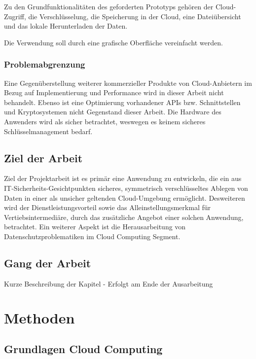 \documentclass[12pt,a4paper,bibliography=totocnumbered,listof=totocnumbered]{scrartcl}
\begin{document}
Zu den Grundfunktionalitäten des geforderten Prototyps gehören der Cloud-Zugriff, die Verschlüsselung, die Speicherung in der Cloud, eine Dateiübersicht und das lokale Herunterladen der Daten.

Die Verwendung soll durch eine grafische Oberfläche vereinfacht werden.

\subsubsection{Problemabgrenzung}
Eine Gegenüberstellung weiterer kommerzieller Produkte von Cloud-Anbietern im Bezug auf Implementierung und Performance wird in dieser Arbeit nicht behandelt. Ebenso ist eine Optimierung vorhandener APIs bzw. Schnittstellen und Kryptosystemen nicht Gegenstand dieser Arbeit. Die Hardware des Anwenders wird als sicher betrachtet, weswegen es keinem sicheres Schlüsselmanagement bedarf.

\subsection{Ziel der Arbeit}
Ziel der Projektarbeit ist es primär eine Anwendung zu entwickeln, die ein aus IT-Sicherheits-Gesichtpunkten sicheres, symmetrisch verschlüsseltes Ablegen von Daten in einer als unsicher geltenden Cloud-Umgebung ermöglicht. Desweiteren wird der Dienstleistungsvorteil sowie das Alleinstellungsmerkmal für Vertiebsintermediäre, durch das zusätzliche Angebot einer solchen Anwendung, betrachtet. Ein weiterer Aspekt ist die Herausarbeitung von Datenschutzproblematiken im Cloud Computing Segment.

\subsection{Gang der Arbeit}
Kurze Beschreibung der Kapitel - Erfolgt am Ende der Ausarbeitung
\pagebreak

\section{Methoden}
\subsection{Grundlagen Cloud Computing}
\end{document}
